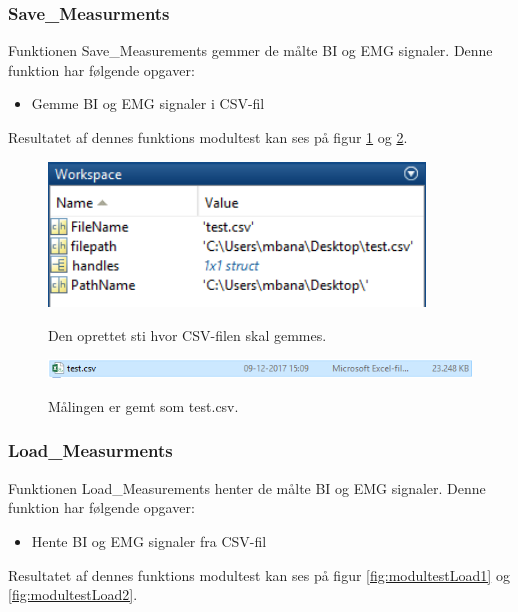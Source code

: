 \subsubsection{Save\_Measurments} 

Funktionen Save\_Measurements gemmer de målte BI og EMG signaler. Denne funktion har følgende opgaver:
\begin{itemize}
\item Gemme BI og EMG signaler i CSV-fil
\end{itemize}

Resultatet af dennes funktions modultest kan ses på figur \ref{fig:modultestsave1} og \ref{fig:modultestsave3}.



\begin{figure}[H] 
\centering
{\includegraphics[width=10cm]
{Figure/modultestsave1}}
\caption{Den oprettet sti hvor CSV-filen skal gemmes.}
\label{fig:modultestsave1}
\end{figure}



\begin{figure}[H] 
\centering
{\includegraphics[width=\linewidth]
{Figure/modultestsave3}}
\caption{Målingen er gemt som test.csv.}
\label{fig:modultestsave3}
\end{figure}


\subsubsection{Load\_Measurments} 

Funktionen Load\_Measurements henter de målte BI og EMG signaler. Denne funktion har følgende opgaver:
\begin{itemize}
\item Hente BI og EMG signaler fra CSV-fil
\end{itemize}

Resultatet af dennes funktions modultest kan ses på figur \ref{fig:modultestLoad1} og \ref{fig:modultestLoad2}.


